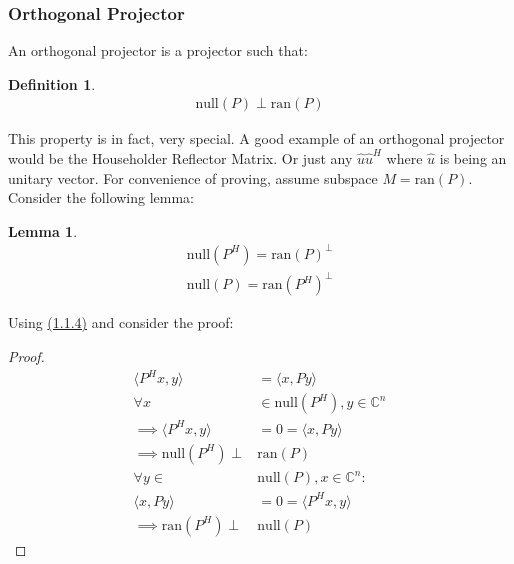 \documentclass[]{article}
\theoremstyle{definition}
\newtheorem{lemma}{Lemma}
\newtheorem{definition}{Definition}
\begin{document}
        \subsubsection{Orthogonal Projector}
            An orthogonal projector is a projector such that: 
            \begin{definition}
                \begin{align}
                    \text{null}(P) \perp \text{ran}(P)
                \end{align}    
            \end{definition}
            
            This property is in fact, very special. A good example of an orthogonal projector would be the Householder Reflector Matrix. Or just any $\hat{u}\hat{u}^H$ where $\hat{u}$ is being an unitary vector. For convenience of proving, assume subspace $M = \text{ran}(P)$. Consider the following lemma: 
            \begin{lemma}
                \begin{align}
                    \text{null}(P^H) = \text{ran}(P)^{\perp}
                    \\
                    \text{null}(P) = \text{ran}(P^H)^{\perp}
                \end{align}    
            \end{lemma}
            \noindent
            Using \hyperref[a:1.1.4]{(1.1.4)} and consider the proof: 
            \begin{proof}
                \begin{align}
                    \langle P^Hx, y\rangle &= \langle x, Py\rangle 
                    \\
                    \forall  x &\in \text{null}(P^H), y\in \mathbb{C}^n
                    \\
                    \implies \langle P^Hx ,y\rangle &= 0 = \langle x, Py\rangle
                    \\
                    \implies \text{null}(P^H) \perp& \text{ran}(P)
                    \\
                    \forall y \in& \text{null}(P), x \in \mathbb{C}^n: 
                    \\
                    \langle x, Py\rangle &= 0 = \langle P^Hx, y\rangle
                    \\
                    \implies \text{ran}(P^H) \perp& \text{null}(P)
                \end{align}
            \end{proof}
            
\end{document}
